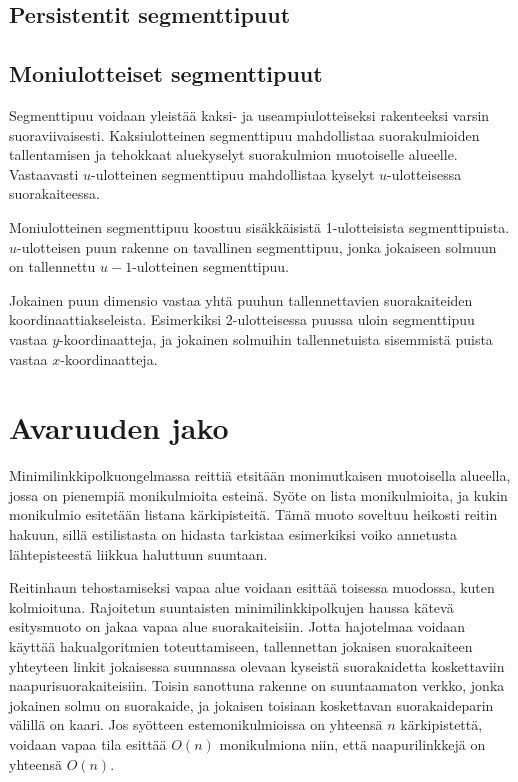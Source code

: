 \documentclass[finnish]{tktltiki2}
\theoremstyle{definition}
\theoremstyle{remark}
\begin{document}
\subsection{Persistentit segmenttipuut}

\subsection{Moniulotteiset segmenttipuut}

Segmenttipuu voidaan yleistää kaksi- ja useampiulotteiseksi rakenteeksi varsin suoraviivaisesti.
Kaksiulotteinen segmenttipuu mahdollistaa suorakulmioiden tallentamisen ja tehokkaat aluekyselyt suorakulmion muotoiselle alueelle.
Vastaavasti $u$-ulotteinen segmenttipuu mahdollistaa kyselyt $u$-ulotteisessa suorakaiteessa.

Moniulotteinen segmenttipuu koostuu sisäkkäisistä 1-ulotteisista segmenttipuista.
$u$-ulotteisen puun rakenne on tavallinen segmenttipuu, jonka jokaiseen solmuun on tallennettu $u-1$-ulotteinen segmenttipuu.

Jokainen puun dimensio vastaa yhtä puuhun tallennettavien suorakaiteiden koordinaattiakseleista.
Esimerkiksi 2-ulotteisessa puussa uloin segmenttipuu vastaa $y$-koordinaatteja, ja jokainen solmuihin tallennetuista sisemmistä puista vastaa $x$-koordinaatteja.




\section{Avaruuden jako}\label{sec:jako}

Minimilinkkipolkuongelmassa reittiä etsitään monimutkaisen muotoisella alueella, jossa on pienempiä monikulmioita esteinä.
Syöte on lista monikulmioita, ja kukin monikulmio esitetään listana kärkipisteitä.
Tämä muoto soveltuu heikosti reitin hakuun, sillä estilistasta on hidasta tarkistaa esimerkiksi voiko annetusta lähtepisteestä liikkua haluttuun suuntaan.

Reitinhaun tehostamiseksi vapaa alue voidaan esittää toisessa muodossa, kuten kolmioituna.
Rajoitetun suuntaisten minimilinkkipolkujen haussa kätevä esitysmuoto on jakaa vapaa alue suorakaiteisiin.
Jotta hajotelmaa voidaan käyttää hakualgoritmien toteuttamiseen, tallennettan jokaisen suorakaiteen yhteyteen linkit jokaisessa suunnassa olevaan kyseistä suorakaidetta koskettaviin naapurisuorakaiteisiin.
Toisin sanottuna rakenne on suuntaamaton verkko, jonka jokainen solmu on suorakaide, ja jokaisen toisiaan koskettavan suorakaideparin välillä on kaari.
Jos syötteen estemonikulmioissa on yhteensä $n$ kärkipistettä, voidaan vapaa tila esittää $O(n)$ monikulmiona niin, että naapurilinkkejä on yhteensä $O(n)$.
\end{document}

